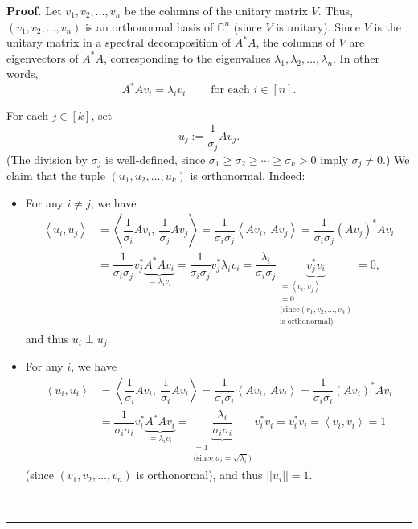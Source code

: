 \documentclass[numbers=enddot,12pt,final,onecolumn,notitlepage]{scrartcl}%
\numberwithin{exer}{subsection}
\theoremstyle{definition}
\newenvironment{proof}[1][Proof]{\noindent\textbf{#1.} }{\ \rule{0.5em}{0.5em}}
\begin{document}
\begin{proof}
Let $v_{1},v_{2},\ldots,v_{n}$ be the columns of the unitary matrix $V$. Thus,
$\left(  v_{1},v_{2},\ldots,v_{n}\right)  $ is an orthonormal basis of
$\mathbb{C}^{n}$ (since $V$ is unitary). Since $V$ is the unitary matrix in a
spectral decomposition of $A^{\ast}A$, the columns of $V$ are eigenvectors of
$A^{\ast}A$, corresponding to the eigenvalues $\lambda_{1},\lambda_{2}%
,\ldots,\lambda_{n}$. In other words,%
\[
A^{\ast}Av_{i}=\lambda_{i}v_{i}\ \ \ \ \ \ \ \ \ \ \text{for each }i\in\left[
n\right]  .
\]


For each $j\in\left[  k\right]  $, set%
\[
u_{j}:=\dfrac{1}{\sigma_{j}}Av_{j}.
\]
(The division by $\sigma_{j}$ is well-defined, since $\sigma_{1}\geq\sigma
_{2}\geq\cdots\geq\sigma_{k}>0$ imply $\sigma_{j}\neq0$.) We claim that the
tuple $\left(  u_{1},u_{2},\ldots,u_{k}\right)  $ is orthonormal. Indeed:

\begin{itemize}
\item For any $i\neq j$, we have%
\begin{align*}
\left\langle u_{i},u_{j}\right\rangle  & =\left\langle \dfrac{1}{\sigma_{i}%
}Av_{i},\ \dfrac{1}{\sigma_{j}}Av_{j}\right\rangle =\dfrac{1}{\sigma_{i}%
\sigma_{j}}\left\langle Av_{i},\ Av_{j}\right\rangle =\dfrac{1}{\sigma
_{i}\sigma_{j}}\left(  Av_{j}\right)  ^{\ast}Av_{i}\\
& =\dfrac{1}{\sigma_{i}\sigma_{j}}v_{j}^{\ast}\underbrace{A^{\ast}Av_{i}%
}_{=\lambda_{i}v_{i}}=\dfrac{1}{\sigma_{i}\sigma_{j}}v_{j}^{\ast}\lambda
_{i}v_{i}=\dfrac{\lambda_{i}}{\sigma_{i}\sigma_{j}}\underbrace{v_{j}^{\ast
}v_{i}}_{\substack{=\left\langle v_{i},v_{j}\right\rangle \\=0\\\text{(since
}\left(  v_{1},v_{2},\ldots,v_{n}\right)  \\\text{is orthonormal)}}}=0,
\end{align*}
and thus $u_{i}\perp u_{j}$.

\item For any $i$, we have%
\begin{align*}
\left\langle u_{i},u_{i}\right\rangle  & =\left\langle \dfrac{1}{\sigma_{i}%
}Av_{i},\ \dfrac{1}{\sigma_{i}}Av_{i}\right\rangle =\dfrac{1}{\sigma_{i}%
\sigma_{i}}\left\langle Av_{i},\ Av_{i}\right\rangle =\dfrac{1}{\sigma
_{i}\sigma_{i}}\left(  Av_{i}\right)  ^{\ast}Av_{i}\\
& =\dfrac{1}{\sigma_{i}\sigma_{i}}v_{i}^{\ast}\underbrace{A^{\ast}Av_{i}%
}_{=\lambda_{i}v_{i}}=\underbrace{\dfrac{\lambda_{i}}{\sigma_{i}\sigma_{i}}%
}_{\substack{=1\\\text{(since }\sigma_{i}=\sqrt{\lambda_{i}}\text{)}}%
}v_{i}^{\ast}v_{i}=v_{i}^{\ast}v_{i}=\left\langle v_{i},v_{i}\right\rangle =1
\end{align*}
(since $\left(  v_{1},v_{2},\ldots,v_{n}\right)  $ is orthonormal), and thus
$\left\vert \left\vert u_{i}\right\vert \right\vert =1$.
\end{itemize}


\end{proof}
\end{document}
